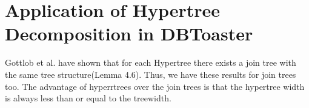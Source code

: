 \documentclass[12pt]{article}
\newtheorem{theorem}{Theorem}
\begin{document}
%
\section{Application of Hypertree Decomposition in DBToaster}
Gottlob et al. have shown that for each Hypertree there exists a join tree with the same tree structure(Lemma 4.6)\cite{1}. Thus, we have these results for join trees too. The advantage of hyperrtrees over the join trees is that the hypertree width is always less than or equal to the treewidth. %
\end{document}
